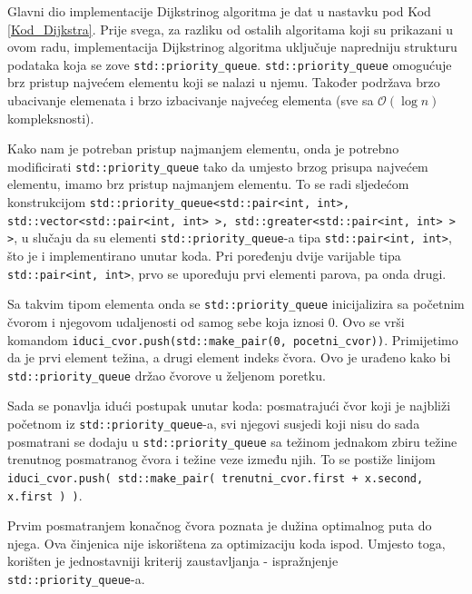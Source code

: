 \documentclass[conference]{IEEEtran}
\begin{document}

Glavni dio implementacije Dijkstrinog algoritma je dat u nastavku pod Kod \ref{Kod_Dijkstra}. Prije svega, za razliku od ostalih algoritama koji su prikazani u ovom radu, implementacija Dijkstrinog algoritma uključuje napredniju strukturu podataka koja se zove \lstinline{std::priority_queue}. \lstinline{std::priority_queue} omogućuje brz pristup najvećem elementu koji se nalazi u njemu. Također podržava brzo ubacivanje elemenata i brzo izbacivanje najvećeg elementa (sve sa $\mathcal{O}(\log{n})$ kompleksnosti).

Kako nam je potreban pristup najmanjem elementu, onda je potrebno modificirati \lstinline{std::priority_queue} tako da umjesto brzog prisupa najvećem elementu, imamo brz pristup najmanjem elementu. To se radi sljedećom konstrukcijom \lstinline{std::priority_queue<std::pair<int, int>, std::vector<std::pair<int, int> >, std::greater<std::pair<int, int> > >}, u slučaju da su elementi \lstinline{std::priority_queue}-a tipa \lstinline{std::pair<int, int>}, što je i implementirano unutar koda. Pri poređenju dvije varijable tipa \lstinline{std::pair<int, int>}, prvo se upoređuju prvi elementi parova, pa onda drugi.

Sa takvim tipom elementa onda se \lstinline{std::priority_queue} inicijalizira sa početnim čvorom i njegovom udaljenosti od samog sebe koja iznosi 0. Ovo se vrši komandom \lstinline{iduci_cvor.push(std::make_pair(0, pocetni_cvor))}. Primijetimo da je prvi element težina, a drugi element indeks čvora. Ovo je urađeno kako bi \lstinline{std::priority_queue} držao čvorove u željenom poretku.

Sada se ponavlja idući postupak unutar koda: posmatrajući čvor koji je najbliži početnom iz \lstinline{std::priority_queue}-a, svi njegovi susjedi koji nisu do sada posmatrani se dodaju u \lstinline{std::priority_queue} sa težinom jednakom zbiru težine trenutnog posmatranog čvora i težine veze između njih. To se postiže linijom \lstinline{iduci_cvor.push( std::make_pair( trenutni_cvor.first + x.second, x.first ) )}. 

Prvim posmatranjem konačnog čvora poznata je dužina optimalnog puta do njega. Ova činjenica nije iskorištena za optimizaciju koda ispod. Umjesto toga, korišten je jednostavniji kriterij zaustavljanja - ispražnjenje \lstinline{std::priority_queue}-a.
\end{document}
